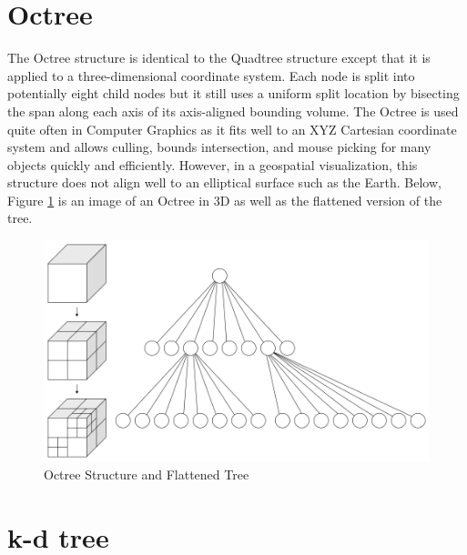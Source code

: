 \section{Octree}

The Octree structure is identical to the Quadtree structure except that it is
applied to a three-dimensional coordinate system. Each node is split into
potentially eight child nodes but it still uses a uniform split location by
bisecting the span along each axis of its axis-aligned bounding volume. The
Octree is used quite often in Computer Graphics as it fits well to an XYZ
Cartesian coordinate system and allows culling, bounds intersection, and mouse
picking for many objects quickly and efficiently. However, in a geospatial
visualization, this structure does not align well to an elliptical surface such
as the Earth. Below, Figure \ref{fig:octree} is an image of an Octree in 3D as
well as the flattened version of the tree.

\begin{figure}[htb]
\begin{center}
\includegraphics[width=.9\linewidth]{images/Octree_flat.png}
\end{center}
\caption{Octree Structure and Flattened Tree \cite{11_octree2.png}}
\label{fig:octree}
\end{figure}

\section{k-d tree}

